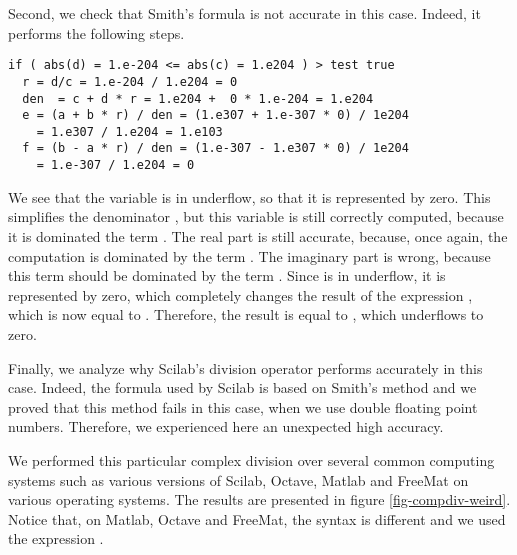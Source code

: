 Second, we check that Smith's formula is not accurate in this 
case. Indeed, it performs the following steps.
\begin{lstlisting}
if ( abs(d) = 1.e-204 <= abs(c) = 1.e204 ) > test true
  r = d/c = 1.e-204 / 1.e204 = 0
  den  = c + d * r = 1.e204 +  0 * 1.e-204 = 1.e204
  e = (a + b * r) / den = (1.e307 + 1.e-307 * 0) / 1e204 
    = 1.e307 / 1.e204 = 1.e103
  f = (b - a * r) / den = (1.e-307 - 1.e307 * 0) / 1e204 
    = 1.e-307 / 1.e204 = 0
\end{lstlisting}
We see that the variable  is in underflow, so that it is 
represented by zero. This simplifies the denominator ,
but this variable is still correctly computed, because it is dominated 
the term . The real part  is still accurate, because,
once again, the computation is dominated by the term .
The imaginary part  is wrong, because this term should be 
dominated by the term . Since  is in underflow, it 
is represented by zero, which completely changes the result of the 
expression , which is now equal to .
Therefore, the result is equal to , which 
underflows to zero. 

Finally, we analyze why Scilab's division operator performs 
accurately in this case. Indeed, the formula used by Scilab 
is based on Smith's method and we proved that this method 
fails in this case, when we use double floating point numbers. 
Therefore, we experienced here an unexpected high accuracy.

We performed this particular complex division over several common 
computing systems such as various versions of Scilab, Octave, 
Matlab and FreeMat on various operating systems. The results are presented
in figure \ref{fig-compdiv-weird}. Notice that, on Matlab, 
Octave and FreeMat, the syntax is different and we 
used the expression .

